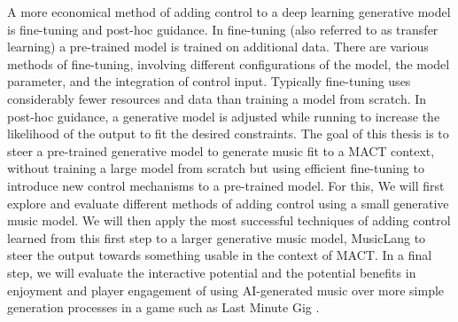 A more economical method of adding control to a deep learning generative model is fine-tuning and post-hoc guidance. In fine-tuning (also referred to as transfer learning) a pre-trained model is trained on additional data. There are various methods of fine-tuning, involving different configurations of the model, the model parameter, and the integration of control input. Typically fine-tuning uses considerably fewer resources and data than training a model from scratch. In post-hoc guidance, a generative model is adjusted while running to increase the likelihood of the output to fit the desired constraints. The goal of this thesis is to steer a pre-trained generative model to generate music fit to a MACT context, without training a large model from scratch but using efficient fine-tuning to introduce new control mechanisms to a pre-trained model. For this, We will first explore and evaluate different methods of adding control using a small generative music model. We will then apply the most successful techniques of adding control learned from this first step to a larger generative music model, MusicLang to steer the output towards something usable in the context of MACT. In a final step, we will evaluate the interactive potential and the potential benefits in enjoyment and player engagement of using AI-generated music over more simple generation processes in a game such as Last Minute Gig \cite{Chalkiadakis_2022}.

